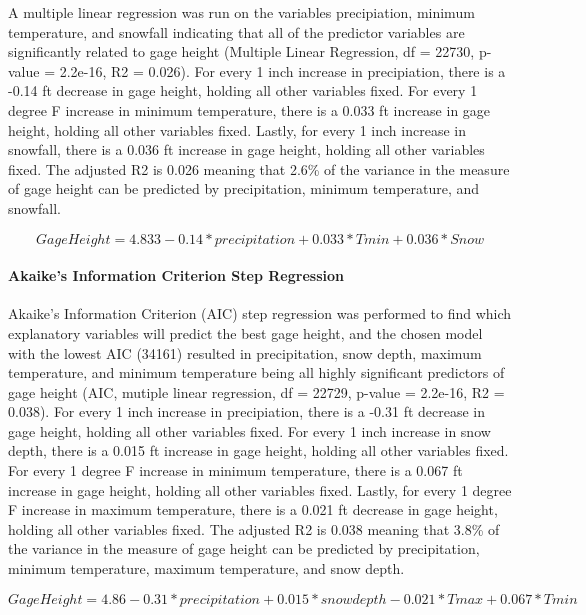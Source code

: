 \documentclass[12pt,]{article}
\let\oldparagraph\paragraph
\renewcommand{\paragraph}[1]{\oldparagraph{#1}\mbox{}}
\begin{document}
A multiple linear regression was run on the variables precipiation,
minimum temperature, and snowfall indicating that all of the predictor
variables are significantly related to gage height (Multiple Linear
Regression, df = 22730, p-value = 2.2e-16, R2 = 0.026). For every 1 inch
increase in precipiation, there is a -0.14 ft decrease in gage height,
holding all other variables fixed. For every 1 degree F increase in
minimum temperature, there is a 0.033 ft increase in gage height,
holding all other variables fixed. Lastly, for every 1 inch increase in
snowfall, there is a 0.036 ft increase in gage height, holding all other
variables fixed. The adjusted R2 is 0.026 meaning that 2.6\% of the
variance in the measure of gage height can be predicted by
precipitation, minimum temperature, and snowfall.

\[GageHeight = 4.833 - 0.14*precipitation + 0.033*Tmin + 0.036*Snow   \]

\hypertarget{akaikes-information-criterion-step-regression}{%
\paragraph{Akaike's Information Criterion Step
Regression}\label{akaikes-information-criterion-step-regression}}

Akaike's Information Criterion (AIC) step regression was performed to
find which explanatory variables will predict the best gage height, and
the chosen model with the lowest AIC (34161) resulted in precipitation,
snow depth, maximum temperature, and minimum temperature being all
highly significant predictors of gage height (AIC, mutiple linear
regression, df = 22729, p-value = 2.2e-16, R2 = 0.038). For every 1 inch
increase in precipiation, there is a -0.31 ft decrease in gage height,
holding all other variables fixed. For every 1 inch increase in snow
depth, there is a 0.015 ft increase in gage height, holding all other
variables fixed. For every 1 degree F increase in minimum temperature,
there is a 0.067 ft increase in gage height, holding all other variables
fixed. Lastly, for every 1 degree F increase in maximum temperature,
there is a 0.021 ft decrease in gage height, holding all other variables
fixed. The adjusted R2 is 0.038 meaning that 3.8\% of the variance in
the measure of gage height can be predicted by precipitation, minimum
temperature, maximum temperature, and snow depth.

\[GageHeight = 4.86 - 0.31*precipitation + 0.015*snowdepth - 0.021*Tmax + 0.067*Tmin   \]
\end{document}
